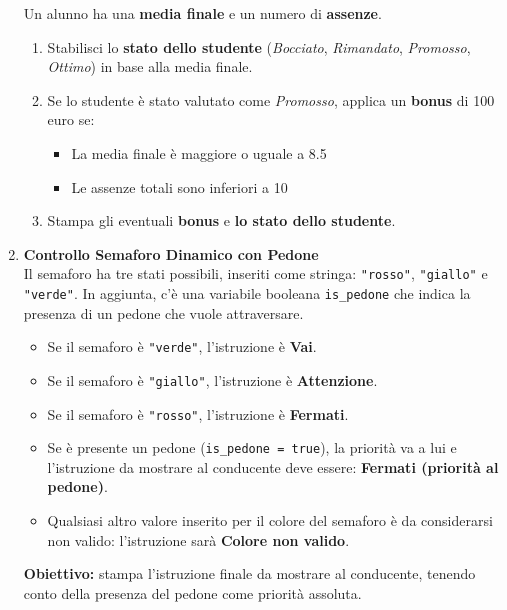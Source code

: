 \documentclass{article}
\begin{document}
\begin{enumerate}
    Un alunno ha una \textbf{media finale} e un numero di \textbf{assenze}.

    \begin{enumerate}
        \item Stabilisci lo \textbf{stato dello studente} (\textit{Bocciato}, \textit{Rimandato}, \textit{Promosso}, \textit{Ottimo}) in base alla media finale.
        
        \item Se lo studente è stato valutato come \textit{Promosso}, applica un \textbf{bonus} di 100 euro se:
        \begin{itemize}
            \item La media finale è maggiore o uguale a 8.5
            \item Le assenze totali sono inferiori a 10
        \end{itemize}
        
        \item Stampa gli eventuali \textbf{bonus} e \textbf{lo stato dello studente}.
    \end{enumerate}

    \vspace{0.5cm}

    \item \textbf{Controllo Semaforo Dinamico con Pedone} \\

    Il semaforo ha tre stati possibili, inseriti come stringa: \texttt{"rosso"}, \texttt{"giallo"} e \texttt{"verde"}. In aggiunta, c'è una variabile booleana \texttt{is\_pedone} che indica la presenza di un pedone che vuole attraversare.

    \begin{itemize}
        \item Se il semaforo è \texttt{"verde"}, l'istruzione è \textbf{Vai}.
        \item Se il semaforo è \texttt{"giallo"}, l'istruzione è \textbf{Attenzione}.
        \item Se il semaforo è \texttt{"rosso"}, l'istruzione è \textbf{Fermati}.
        \item Se è presente un pedone (\texttt{is\_pedone = true}), la priorità va a lui e l'istruzione da mostrare al conducente deve essere: \textbf{Fermati (priorità al pedone)}.
        \item Qualsiasi altro valore inserito per il colore del semaforo è da considerarsi non valido: l'istruzione sarà \textbf{Colore non valido}.
    \end{itemize}

    \medskip

    \noindent
    \textbf{Obiettivo:} stampa l'istruzione finale da mostrare al conducente, tenendo conto della presenza del pedone come priorità assoluta.


\end{enumerate}
\end{document}
